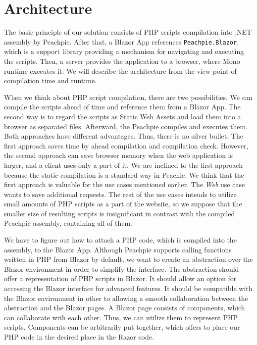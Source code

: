 \section{Architecture}

The basic principle of our solution consists of PHP scripts compilation into .NET assembly by Peachpie.
After that, a Blazor App references \texttt{Peachpie.Blazor}, which is a support library providing a mechanism for navigating and executing the scripts.
Then, a server provides the application to a browser, where Mono runtime executes it.
We will describe the architecture from the view point of compilation time and runtime.
\par
When we think about PHP script compilation, there are two possibilities.
We can compile the scripts ahead of time and reference them from a Blazor App. 
The second way is to regard the scripts as Static Web Assets and load them into a browser as separated files.
Afterward, the Peachpie compiles and executes them.
Both approaches have different advantages. 
Thus, there is no silver bullet.
The first approach saves time by ahead compilation and compilation check.
However, the second approach can save browser memory when the web application is larger, and a client uses only a part of it.
We are inclined to the first approach because the static compilation is a standard way in Peachie.
We think that the first approach is valuable for the use cases mentioned earlier.
The \textit{Web} use case wants to save additional requests. 
The rest of the use cases intends to utilize small amounts of PHP scripts as a part of the website, so we suppose that the smaller size of resulting scripts is insignificant in contrast with the compiled Peachpie assembly, containing all of them. 
\par
We have to figure out how to attach a PHP code, which is compiled into the assembly, to the Blazor App.
Although Peachpie supports calling functions written in PHP from Blazor by default, we want to create an abstraction over the Blazor environment in order to simplify the interface.
The abstraction should offer a representation of PHP scripts in Blazor.
It should allow an option for accessing the Blazor interface for advanced features.
It should be compatible with the Blazor environment in other to allowing a smooth collaboration between the abstraction and the Blazor pages.
A Blazor page consists of components, which can collaborate with each other.
Thus, we can utilize them to represent PHP scripts.
Components can be arbitrarily put together, which offers to place our PHP code in the desired place in the Razor code.
